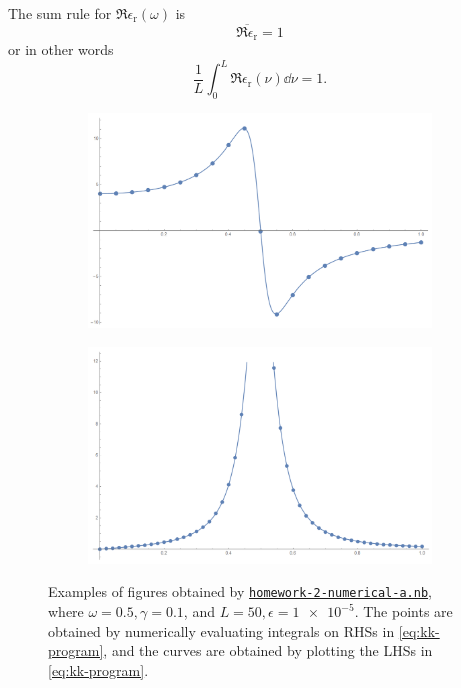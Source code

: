 \documentclass[hyperref, a4paper]{article}
\begin{document}
\begin{itemize}
    The sum rule for $\Re \epsilon_\text{r}(\omega)$ is 
    \begin{equation}
        \overline{\Re \epsilon_\text{r}} = 1
    \end{equation}
    or in other words
    \begin{equation}
        \frac{1}{L} \int_0^L \Re \epsilon_\text{r}(\nu) \dd{\nu} = 1.
    \end{equation}
\end{itemize}

\begin{figure}
    \centering
    \begin{subfigure}{0.45\textwidth}
        \includegraphics[width=\textwidth]{example-re-epsilon.PNG}
    \end{subfigure}
    \begin{subfigure}{0.45\textwidth}
        \includegraphics[width=\textwidth]{example-im-epsilon.PNG}
    \end{subfigure}
    \caption{Examples of figures obtained by \href{./homework-2-numerical-a.nb}{\texttt{homework-2-numerical-a.nb}}, where $\omega = 0.5, \gamma = 0.1$, and $L = 50, \epsilon = \num{1e-5}$. The points are obtained by numerically evaluating integrals on RHSs in \eqref{eq:kk-program}, and the curves are obtained by plotting the LHSs in \eqref{eq:kk-program}.}
    \label{fig:demo-curve}
\end{figure}
\end{document}
